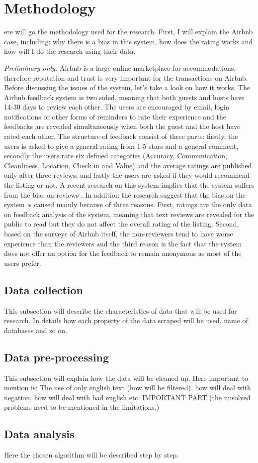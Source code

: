 %
%
\let\textcircled=\pgftextcircled
\chapter{Methodology}
\label{chap:methods}

ere will go the methodology used for the research. First, I will explain the Airbnb case, including: why there is a bias in this system, how does the rating works and how will I do the research using their data. 

\textit{Preliminary only:} Airbnb is a large online marketplace for accommodations, therefore reputation and trust is very important for the transactions on Airbnb. Before discussing the issues of the system, let’s take a look on how it works. The Airbnb feedback system is two sided, meaning that both guests and hosts have 14-30 days to review each other. The users are encouraged by email, login notifications or other forms of reminders to rate their experience and the feedbacks are revealed simultaneously when both the guest and the host have rated each other. The structure of feedback consist of three parts: firstly, the users is asked to give a general rating from 1-5 stars and a general comment, secondly the users rate six defined categories (Accuracy, Communication, Cleanliness, Location, Check in and Value) and the average ratings are published only after three reviews; and lastly the users are asked if they would recommend the listing or not. A recent research on this system implies that the system suffers from the bias on reviews \cite{fradkin2016bias}. In addition the research suggest that the bias on the system is caused mainly because of three reasons. First, ratings are the only data on feedback analysis of the system, meaning that text reviews are revealed for the public to read but they do not affect the overall rating of the listing. Second, based on the surveys of Airbnb itself, the non-reviewers tend to have worse experience than the reviewers and the third reason is the fact that the system does not offer an option for the feedback to remain anonymous as most of the users prefer.

\section{Data collection}
This subsection will describe the characteristics of data that will be used for research. In details how each property of the data scraped will be used, name of databases and so on.
\section{Data pre-processing}
This subsection will explain how the data will be cleaned up. Here important to mention is: The use of only english text (how will be filtered), how will deal with negation, how will deal with bad english etc. IMPORTANT PART (the unsolved problems need to be mentioned in the limitations.)
\section{Data analysis}
Here the chosen algorithm will be described step by step. 